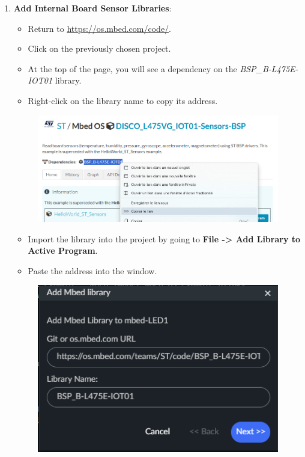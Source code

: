 \documentclass[10pt,a4paper,onecolumn]{article}
\begin{document}
\begin{enumerate}
    \item \textbf{Add Internal Board Sensor Libraries}:
    \begin{itemize}
        \item Return to \url{https://os.mbed.com/code/}.
        \item Click on the previously chosen project.
        \item At the top of the page, you will see a dependency on the \textit{BSP\_B-L475E-IOT01} library.
        \item Right-click on the library name to copy its address.
    \end{itemize}
    
    \begin{figure}[H]
        \begin{center}
            \includegraphics[width=\dimexpr\textwidth-1cm\relax,height=\dimexpr0.25\textheight-1cm\relax,keepaspectratio]{images/11.png}
        \end{center}
    \end{figure}

    \begin{itemize}
        \item Import the library into the project by going to \textbf{File -> Add Library to Active Program}.
        \item Paste the address into the window.
    \end{itemize}
    
    \begin{figure}[H]
        \begin{center}
            \includegraphics[width=\dimexpr\textwidth-1cm\relax,height=\dimexpr0.25\textheight-1cm\relax,keepaspectratio]{images/12.png}
        \end{center}
    \end{figure}


\end{enumerate}
\end{document}
